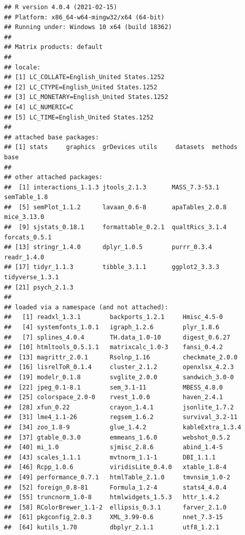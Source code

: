 \documentclass[
  english,
]{book}
\begin{document}
\begin{verbatim}
## R version 4.0.4 (2021-02-15)
## Platform: x86_64-w64-mingw32/x64 (64-bit)
## Running under: Windows 10 x64 (build 18362)
## 
## Matrix products: default
## 
## locale:
## [1] LC_COLLATE=English_United States.1252 
## [2] LC_CTYPE=English_United States.1252   
## [3] LC_MONETARY=English_United States.1252
## [4] LC_NUMERIC=C                          
## [5] LC_TIME=English_United States.1252    
## 
## attached base packages:
## [1] stats     graphics  grDevices utils     datasets  methods   base     
## 
## other attached packages:
##  [1] interactions_1.1.3 jtools_2.1.3       MASS_7.3-53.1      semTable_1.8      
##  [5] semPlot_1.1.2      lavaan_0.6-8       apaTables_2.0.8    mice_3.13.0       
##  [9] sjstats_0.18.1     formattable_0.2.1  qualtRics_3.1.4    forcats_0.5.1     
## [13] stringr_1.4.0      dplyr_1.0.5        purrr_0.3.4        readr_1.4.0       
## [17] tidyr_1.1.3        tibble_3.1.1       ggplot2_3.3.3      tidyverse_1.3.1   
## [21] psych_2.1.3       
## 
## loaded via a namespace (and not attached):
##   [1] readxl_1.3.1        backports_1.2.1     Hmisc_4.5-0        
##   [4] systemfonts_1.0.1   igraph_1.2.6        plyr_1.8.6         
##   [7] splines_4.0.4       TH.data_1.0-10      digest_0.6.27      
##  [10] htmltools_0.5.1.1   matrixcalc_1.0-3    fansi_0.4.2        
##  [13] magrittr_2.0.1      Rsolnp_1.16         checkmate_2.0.0    
##  [16] lisrelToR_0.1.4     cluster_2.1.2       openxlsx_4.2.3     
##  [19] modelr_0.1.8        svglite_2.0.0       sandwich_3.0-0     
##  [22] jpeg_0.1-8.1        sem_3.1-11          MBESS_4.8.0        
##  [25] colorspace_2.0-0    rvest_1.0.0         haven_2.4.1        
##  [28] xfun_0.22           crayon_1.4.1        jsonlite_1.7.2     
##  [31] lme4_1.1-26         regsem_1.6.2        survival_3.2-11    
##  [34] zoo_1.8-9           glue_1.4.2          kableExtra_1.3.4   
##  [37] gtable_0.3.0        emmeans_1.6.0       webshot_0.5.2      
##  [40] mi_1.0              sjmisc_2.8.6        abind_1.4-5        
##  [43] scales_1.1.1        mvtnorm_1.1-1       DBI_1.1.1          
##  [46] Rcpp_1.0.6          viridisLite_0.4.0   xtable_1.8-4       
##  [49] performance_0.7.1   htmlTable_2.1.0     tmvnsim_1.0-2      
##  [52] foreign_0.8-81      Formula_1.2-4       stats4_4.0.4       
##  [55] truncnorm_1.0-8     htmlwidgets_1.5.3   httr_1.4.2         
##  [58] RColorBrewer_1.1-2  ellipsis_0.3.1      farver_2.1.0       
##  [61] pkgconfig_2.0.3     XML_3.99-0.6        nnet_7.3-15        
##  [64] kutils_1.70         dbplyr_2.1.1        utf8_1.2.1         

\end{verbatim}
\end{document}
